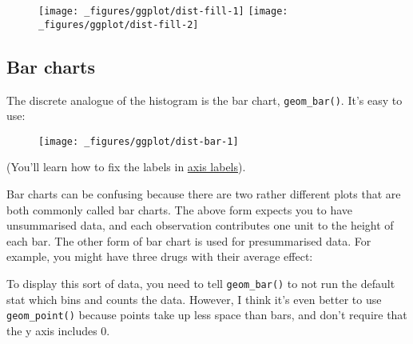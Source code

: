 \begin{figure}[H]
  \texttt{[image: \_figures/ggplot/dist-fill-1]}%
  \texttt{[image: \_figures/ggplot/dist-fill-2]}
\end{figure}

\subsection{Bar charts}\label{sub:bar}

The discrete analogue of the histogram is the bar chart,
\texttt{geom\_bar()}. It's easy to use: 

\begin{Shaded}
\begin{Highlighting}[]
\StringTok{ }
\StringTok{  }\NormalTok{()}
\end{Highlighting}
\end{Shaded}

\begin{figure}[H]
  \texttt{[image: \_figures/ggplot/dist-bar-1]}
\end{figure}

(You'll learn how to fix the labels in
\protect\hyperlink{sub:theme-axis}{axis labels}).

Bar charts can be confusing because there are two rather different plots
that are both commonly called bar charts. The above form expects you to
have unsummarised data, and each observation contributes one unit to the
height of each bar. The other form of bar chart is used for
presummarised data. For example, you might have three drugs with their
average effect:

\begin{Shaded}
\begin{Highlighting}[]
\StringTok{ }\NormalTok{(}
   \NormalTok{(}\NormalTok{, }\NormalTok{, }\NormalTok{),}
   \NormalTok{(}\NormalTok{, }\NormalTok{, }\NormalTok{)}
\NormalTok{)}
\end{Highlighting}
\end{Shaded}

To display this sort of data, you need to tell \texttt{geom\_bar()} to
not run the default stat which bins and counts the data. However, I
think it's even better to use \texttt{geom\_point()} because points take
up less space than bars, and don't require that the y axis includes 0.

